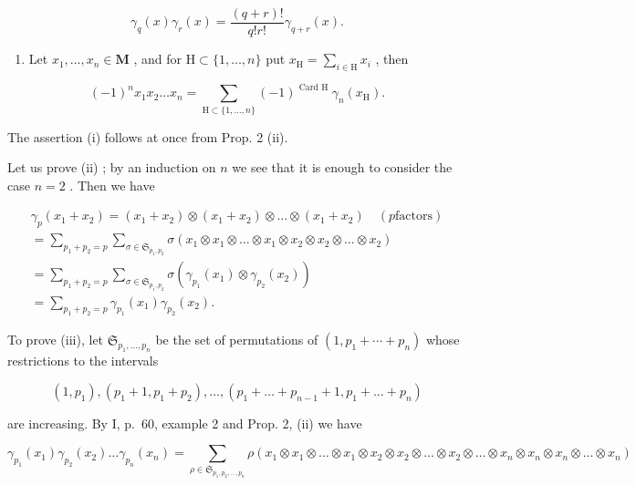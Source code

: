 \[
\gamma_ {q} (x) \gamma_ {r} (x) = \frac {(q + r) !}{q ! r !} \gamma_ {q + r} (x).
\]

\begin{enumerate}
\def\labelenumi{(\alph{enumi})}
\setcounter{enumi}{21}
\tightlist
\item
  Let \(x_{1}, \ldots, x_{n} \in \mathbf{M}\) , and for \(\mathrm{H} \subset \{1, \ldots, n\}\) put \(x_{\mathrm{H}} = \sum_{i \in \mathrm{H}} x_{i}\) , then
\end{enumerate}

\[
(- 1) ^ {n} x _ {1} x _ {2} \dots x _ {n} = \sum_ {\mathrm{H} \subset \{1, \dots , n \}} (- 1) ^ {\text { Card   H }} \gamma_ {n} (x _ {\mathrm{H}}).
\]

The assertion (i) follows at once from Prop. 2 (ii).

Let us prove (ii) ; by an induction on \(n\) we see that it is enough to consider the case \(n = 2\) . Then we have

\[
\begin{array}{l} \gamma_ {p} (x _ {1} + x _ {2}) = (x _ {1} + x _ {2}) \otimes (x _ {1} + x _ {2}) \otimes \dots \otimes (x _ {1} + x _ {2}) \quad (p \text {factors}) \\ = \sum_ {p _ {1} + p _ {2} = p} \sum_ {\sigma \in \mathfrak {S} _ {p _ {1}, p _ {2}}} \sigma (x _ {1} \otimes x _ {1} \otimes \dots \otimes x _ {1} \otimes x _ {2} \otimes x _ {2} \otimes \dots \otimes x _ {2}) \\ = \sum_ {p _ {1} + p _ {2} = p} \sum_ {\sigma \in \mathfrak {S} _ {p _ {1}, p _ {2}}} \sigma (\gamma_ {p _ {1}} (x _ {1}) \otimes \gamma_ {p _ {2}} (x _ {2})) \\ = \sum_ {p _ {1} + p _ {2} = p} \gamma_ {p _ {1}} (x _ {1}) \gamma_ {p _ {2}} (x _ {2}). \end{array}
\]

To prove (iii), let \(\mathfrak{S}_{p_{1},\ldots,p_{n}}\) be the set of permutations of \((1,p_{1}+\cdots+p_{n})\) whose restrictions to the intervals

\[
\left(1, p _ {1}\right), \left(p _ {1} + 1, p _ {1} + p _ {2}\right), \dots , \left(p _ {1} + \dots + p _ {n - 1} + 1, p _ {1} + \dots + p _ {n}\right)
\]

are increasing. By I, p.~60, example 2 and Prop. 2, (ii) we have

\[
\gamma_ {p _ {1}} \left(x _ {1}\right) \gamma_ {p _ {2}} \left(x _ {2}\right) \dots \gamma_ {p _ {n}} \left(x _ {n}\right) = \sum_ {\rho \in \mathfrak {S} _ {p _ {1}, p _ {2}, \dots , p _ {n}}} \rho \left(x _ {1} \otimes x _ {1} \otimes \dots \otimes x _ {1} \otimes x _ {2} \otimes x _ {2} \otimes \dots \otimes x _ {2} \otimes \dots \otimes x _ {n} \otimes x _ {n} \otimes x _ {n} \otimes \dots \otimes x _ {n}\right)
\]


